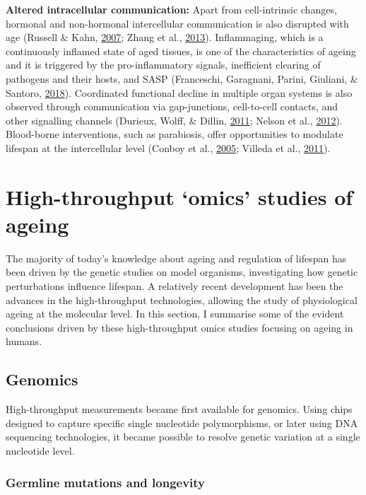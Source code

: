 \documentclass[12pt,twoside]{unicam}
\begin{document}
\textbf{Altered intracellular communication:} Apart from cell-intrinsic changes, hormonal and non-hormonal intercellular communication is also disrupted with age (Russell \& Kahn, \protect\hyperlink{ref-Russell2007}{2007}; Zhang et al., \protect\hyperlink{ref-Zhang2013}{2013}). Inflammaging, which is a continuously inflamed state of aged tissues, is one of the characteristics of ageing and it is triggered by the pro-inflammatory signals, inefficient clearing of pathogens and their hosts, and SASP (Franceschi, Garagnani, Parini, Giuliani, \& Santoro, \protect\hyperlink{ref-Franceschi2018}{2018}). Coordinated functional decline in multiple organ systems is also observed through communication via gap-junctions, cell-to-cell contacts, and other signalling channels (Durieux, Wolff, \& Dillin, \protect\hyperlink{ref-Durieux2011}{2011}; Nelson et al., \protect\hyperlink{ref-Nelson2012}{2012}). Blood-borne interventions, such as parabiosis, offer opportunities to modulate lifespan at the intercellular level (Conboy et al., \protect\hyperlink{ref-Conboy2005}{2005}; Villeda et al., \protect\hyperlink{ref-Villeda2011}{2011}).

\hypertarget{introOmics}{%
\section{High-throughput `omics' studies of ageing}\label{introOmics}}

The majority of today's knowledge about ageing and regulation of lifespan has been driven by the genetic studies on model organisms, investigating how genetic perturbations influence lifespan. A relatively recent development has been the advances in the high-throughput technologies, allowing the study of physiological ageing at the molecular level. In this section, I summarise some of the evident conclusions driven by these high-throughput omics studies focusing on ageing in humans.

\hypertarget{genomics}{%
\subsection{Genomics}\label{genomics}}

High-throughput measurements became first available for genomics. Using chips designed to capture specific single nucleotide polymorphisms, or later using DNA sequencing technologies, it became possible to resolve genetic variation at a single nucleotide level.

\hypertarget{germline-mutations-and-longevity}{%
\subsubsection{Germline mutations and longevity}\label{germline-mutations-and-longevity}}
\end{document}
